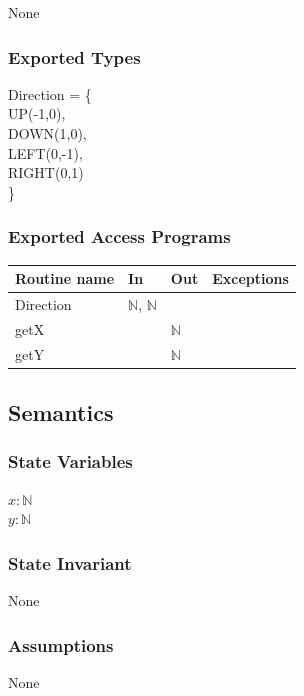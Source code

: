 \documentclass[12pt]{article}
\begin{document}
None

\subsubsection* {Exported Types}

Direction = \{\\
    UP(-1,0),\\
    DOWN(1,0),\\
    LEFT(0,-1),\\
    RIGHT(0,1)\\
\}

\subsubsection* {Exported Access Programs}

\begin{tabular}{| l | l | l | p{5cm} |}
  \hline
  \textbf{Routine name} & \textbf{In} & \textbf{Out} & \textbf{Exceptions}\\
  \hline
  Direction & $\mathbb{N}$, $\mathbb{N}$ & & \\
  \hline
  getX & & $\mathbb{N}$ & \\
  \hline
  getY & & $\mathbb{N}$ & \\
  \hline
  
\end{tabular}


\subsection* {Semantics}

\subsubsection* {State Variables}

$x : \mathbb{N}$\\
$y : \mathbb{N}$\\

\subsubsection* {State Invariant}

None

\subsubsection* {Assumptions}

None
\end{document}
